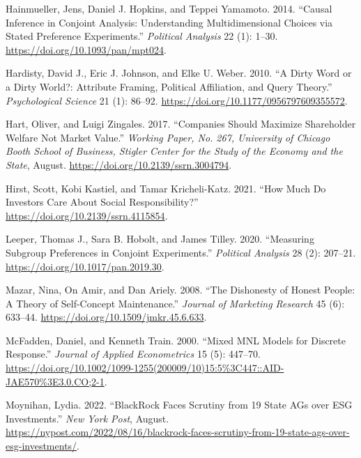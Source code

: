 \documentclass[
  12pt,
]{article}
\newlength{\cslhangindent}
\newlength{\cslentryspacingunit} %
\newenvironment{CSLReferences}[2] %
 {%
  \setlength{\parindent}{0pt}
  \ifodd #1
  \let\oldpar\par
  \def\par{\hangindent=\cslhangindent\oldpar}
  \fi
  \setlength{\parskip}{#2\cslentryspacingunit}
 }%
 {}
\begin{document}
\begin{CSLReferences}{1}{0}
\leavevmode{}%
Hainmueller, Jens, Daniel J. Hopkins, and Teppei Yamamoto. 2014. {``Causal Inference in Conjoint Analysis: Understanding Multidimensional Choices via Stated Preference Experiments.''} \emph{Political Analysis} 22 (1): 1--30. \url{https://doi.org/10.1093/pan/mpt024}.

\leavevmode{}%
Hardisty, David J., Eric J. Johnson, and Elke U. Weber. 2010. {``A Dirty Word or a Dirty World?: Attribute Framing, Political Affiliation, and Query Theory.''} \emph{Psychological Science} 21 (1): 86--92. \url{https://doi.org/10.1177/0956797609355572}.

\leavevmode{}%
Hart, Oliver, and Luigi Zingales. 2017. {``Companies Should Maximize Shareholder Welfare Not Market Value.''} \emph{Working Paper, No. 267, University of Chicago Booth School of Business, Stigler Center for the Study of the Economy and the State}, August. \url{https://doi.org/10.2139/ssrn.3004794}.

\leavevmode{}%
Hirst, Scott, Kobi Kastiel, and Tamar Kricheli-Katz. 2021. {``How Much Do Investors Care About Social Responsibility?''} \url{https://doi.org/10.2139/ssrn.4115854}.

\leavevmode{}%
Leeper, Thomas J., Sara B. Hobolt, and James Tilley. 2020. {``Measuring Subgroup Preferences in Conjoint Experiments.''} \emph{Political Analysis} 28 (2): 207--21. \url{https://doi.org/10.1017/pan.2019.30}.

\leavevmode{}%
Mazar, Nina, On Amir, and Dan Ariely. 2008. {``The Dishonesty of Honest People: A Theory of Self-Concept Maintenance.''} \emph{Journal of Marketing Research} 45 (6): 633--44. \url{https://doi.org/10.1509/jmkr.45.6.633}.

\leavevmode{}%
McFadden, Daniel, and Kenneth Train. 2000. {``Mixed MNL Models for Discrete Response.''} \emph{Journal of Applied Econometrics} 15 (5): 447--70. \url{https://doi.org/10.1002/1099-1255(200009/10)15:5\%3C447::AID-JAE570\%3E3.0.CO;2-1}.

\leavevmode{}%
Moynihan, Lydia. 2022. {``BlackRock Faces Scrutiny from 19 State AGs over ESG Investments.''} \emph{New York Post}, August. \url{https://nypost.com/2022/08/16/blackrock-faces-scrutiny-from-19-state-ags-over-esg-investments/}.


\end{CSLReferences}
\end{document}
